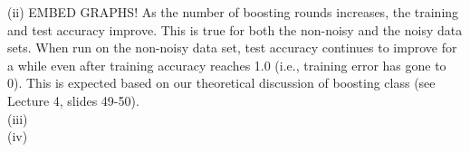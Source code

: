 \documentclass[solution, letterpaper]{cs121}
\begin{document}
(ii) EMBED GRAPHS! As the number of boosting rounds increases, the training and test accuracy improve. This is true for both the non-noisy and the noisy data sets. When run on the non-noisy data set, test accuracy continues to improve for a while even after training accuracy reaches 1.0 (i.e., training error has gone to 0). This is expected based on our theoretical discussion of boosting class (see Lecture 4, slides 49-50). \\

(iii) \\

(iv) \\
\end{document}
